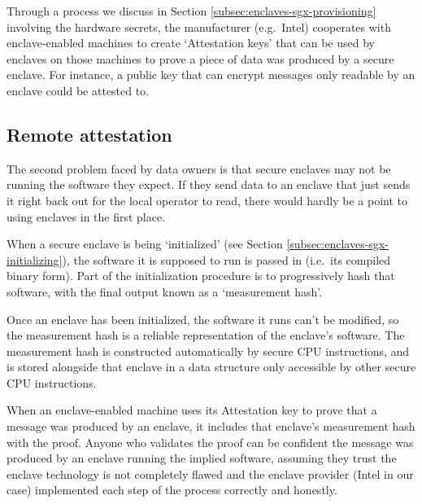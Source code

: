 Through a process we discuss in Section \ref{subsec:enclaves-sgx-provisioning} involving the hardware secrets, the manufacturer (e.g.\ Intel) cooperates with enclave-enabled machines to create `Attestation keys' that can be used by enclaves on those machines to prove a piece of data was produced by a secure enclave. For instance, a public key that can encrypt messages only readable by an enclave could be attested to.


\subsection{Remote attestation}
\label{subsec:simple-enclaves-remote-attestation}

The second problem faced by data owners is that secure enclaves may not be running the software they expect. If they send data to an enclave that just sends it right back out for the local operator to read, there would hardly be a point to using enclaves in the first place.

When a secure enclave is being `initialized' (see Section \ref{subsec:enclaves-sgx-initializing}), the software it is supposed to run is passed in (i.e.\ its compiled binary form). Part of the initialization procedure is to progressively hash that software, with the final output known as a `measurement hash'. \cite{intel-sgx-explained-advanced}

Once an enclave has been initialized, the software it runs can't be modified, so the measurement hash is a reliable representation of the enclave's software. The measurement hash is constructed automatically by secure CPU instructions, and is stored alongside that enclave in a data structure only accessible by other secure CPU instructions.%

When an enclave-enabled machine uses its Attestation key to prove that a message was produced by an enclave, it includes that enclave's measurement hash with the proof. Anyone who validates the proof can be confident the message was produced by an enclave running the implied software, assuming they trust the enclave technology is not completely flawed and the enclave provider (Intel in our case) implemented each step of the process correctly and honestly.\\

